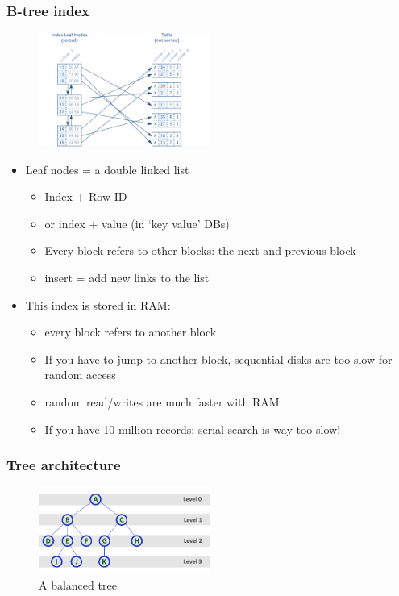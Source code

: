 \documentclass{article}
\begin{document}
\subsubsection{B-tree index}

\begin{figure}[H]
    \centering
    \includegraphics[width=0.5\textwidth]{b-tree-index.png}
    \caption{}
\end{figure}

\begin{itemize}
    \item Leaf nodes = a double linked list
    \begin{itemize}
        \item Index + Row ID
        \item or index + value (in `key value' DBs)
        \item Every block refers to other blocks: the next and previous block
        \item insert = add new links to the list
    \end{itemize}
    \item This index is stored in RAM:
    \begin{itemize}
        \item every block refers to another block
        \item If you have to jump to another block, sequential disks are too slow for random access
        \item random read/writes are much faster with RAM
        \item If you have 10 million records: serial search is way too slow!
    \end{itemize}
\end{itemize}

\subsubsection{Tree architecture}

\begin{figure}[H]
    \centering
    \includegraphics[width=0.5\textwidth]{tree-architecture.png}
    \caption{A balanced tree}
\end{figure}
\end{document}
